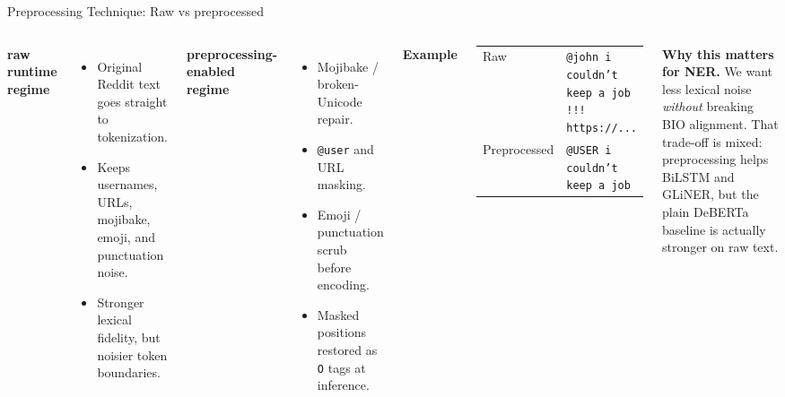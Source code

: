 \documentclass[aspectratio=169,10pt]{beamer}
\begin{document}
\begin{frame}{Preprocessing Technique: Raw vs preprocessed}
  \begin{columns}[T,onlytextwidth]
      \textbf{raw runtime regime}
      \begin{itemize}\footnotesize
        \item Original Reddit text goes straight to tokenization.
        \item Keeps usernames, URLs, mojibake, emoji, and punctuation noise.
        \item Stronger lexical fidelity, but noisier token boundaries.
      \end{itemize}

      \textbf{preprocessing-enabled regime}
      \begin{itemize}\footnotesize
        \item Mojibake / broken-Unicode repair.
        \item \texttt{@user} and URL masking.
        \item Emoji / punctuation scrub before encoding.
        \item Masked positions restored as \texttt{O} tags at inference.
      \end{itemize}

      \textbf{Example}
      \begin{center}\scriptsize
      \begin{tabular}{p{1.6cm}p{5.4cm}}
        \toprule
        Raw & \texttt{@john i couldn't keep a job !!! https://...} \\
        Preprocessed & \texttt{@USER i couldn't keep a job} \\
        \bottomrule
      \end{tabular}
      \end{center}
      \vspace{0.4em}

      \footnotesize
      \textbf{Why this matters for NER.}
      We want less lexical noise \emph{without} breaking BIO alignment. That trade-off is mixed:
      preprocessing helps BiLSTM and GLiNER, but the plain DeBERTa baseline is actually stronger on raw text.
  \end{columns}
\end{frame}
\end{document}
